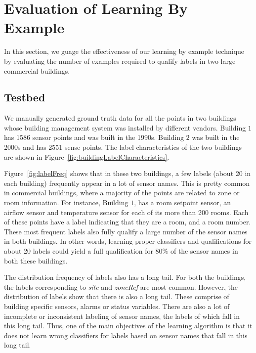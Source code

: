 \section{Evaluation of Learning By Example}

In this section, we guage the effectiveness of our learning by example technique by evaluating the number of examples required to qualify labels in two large commercial buildings. 

\subsection{Testbed}

We manually generated ground truth data for all the points in two buildings whose building management system was installed by different vendors. Building $1$ has 1586 sensor points and was built in the 1990s. Building $2$ was built in the 2000s and has 2551 sense points. The label characteristics of the two buildings are shown in Figure~\ref{fig:buildingLabelCharacteristics}. 

Figure~\ref{fig:labelFreq} shows that in  these two buildings, a few labels (about 20 in each building) frequently appear in a lot of sensor names. This is pretty common in commercial buildings, where a majority of the points are related to zone or room information. For instance, Building $1$, has a room setpoint sensor, an airflow sensor and temperature sensor for each of its more than 200 rooms. Each of these points have a label indicating that they are a room, and a room number. These most frequent labels also fully qualify a large number of the sensor names in both buildings. In other words, learning proper classifiers and qualifications for about 20 labels could yield a full qualification for 80\% of the sensor names in both these buildings.

The distribution frequency of labels also has a long tail. For both the buildings, the labels corresponding to {\it site} and {\it zoneRef} are most common. However, the distribution of labels show that there is also a long tail. These comprise of building specific sensors, alarms or status variables. There are also a lot of incomplete or inconsistent labeling of sensor names, the labels of which fall in this long tail. Thus, one of the main objectives of the learning algorithm is that it does not learn wrong classifiers for labels based on sensor names that fall in this long tail.

